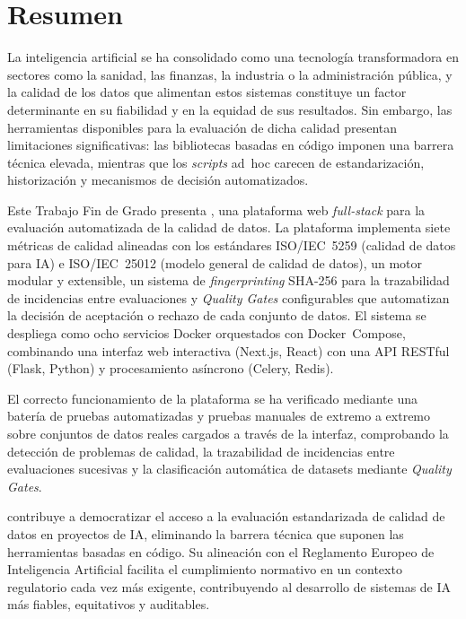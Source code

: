 \chapter{Resumen}

La inteligencia artificial se ha consolidado como una tecnología
transformadora en sectores como la sanidad, las finanzas, la industria o la
administración pública, y la calidad de los datos que alimentan estos sistemas
constituye un factor determinante en su fiabilidad y en la equidad de sus
resultados.  Sin embargo, las herramientas disponibles para la evaluación de
dicha calidad presentan limitaciones significativas: las bibliotecas basadas
en código imponen una barrera técnica elevada, mientras que los \emph{scripts}
ad~hoc carecen de estandarización, historización y mecanismos de decisión
automatizados.

Este Trabajo Fin de Grado presenta \dataqual, una plataforma web
\emph{full-stack} para la evaluación automatizada de la calidad de datos.
La plataforma implementa siete métricas de calidad alineadas con los
estándares ISO/IEC~5259 (calidad de datos para \ac{IA}) e ISO/IEC~25012
(modelo general de calidad de datos), un motor modular y extensible, un
sistema de \emph{fingerprinting} SHA-256 para la trazabilidad de incidencias
entre evaluaciones y \emph{Quality Gates} configurables que automatizan la
decisión de aceptación o rechazo de cada conjunto de datos.  El sistema se
despliega como ocho servicios Docker orquestados
con Docker~Compose, combinando una interfaz web interactiva (Next.js, React)
con una API RESTful (Flask, Python) y procesamiento asíncrono
(Celery, Redis).

El correcto funcionamiento de la plataforma se ha verificado mediante una
batería de pruebas automatizadas y pruebas manuales de extremo a extremo
sobre conjuntos de datos reales cargados a través de la interfaz, comprobando
la detección de problemas de calidad, la trazabilidad de incidencias entre
evaluaciones sucesivas y la clasificación automática de datasets mediante
\emph{Quality Gates}.

\dataqual contribuye a democratizar el acceso a la evaluación estandarizada
de calidad de datos en proyectos de \ac{IA}, eliminando la barrera técnica
que suponen las herramientas basadas en código.  Su alineación con el Reglamento Europeo de
Inteligencia Artificial facilita el cumplimiento normativo en un contexto
regulatorio cada vez más exigente, contribuyendo al desarrollo de sistemas
de \ac{IA} más fiables, equitativos y auditables.


